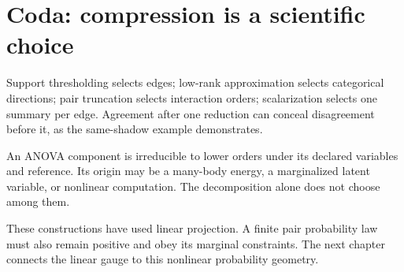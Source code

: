 \section*{Coda: compression is a scientific choice}

Support thresholding selects edges; low-rank approximation selects categorical directions; pair
truncation selects interaction orders; scalarization selects one summary per edge.  Agreement
after one reduction can conceal disagreement before it, as the same-shadow example demonstrates.

An ANOVA component is irreducible to lower orders under its declared variables and reference.
Its origin may be a many-body energy, a marginalized latent variable, or nonlinear computation.
The decomposition alone does not choose among them.

These constructions have used linear projection.  A finite pair probability law must also remain
positive and obey its marginal constraints.  The next chapter connects the linear gauge to this
nonlinear probability geometry.
